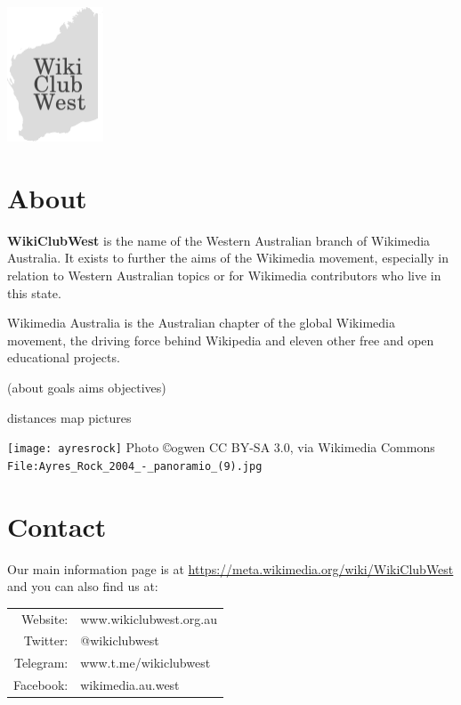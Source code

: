 \documentclass[a4paper,12pt]{article}
\begin{document}
\pagestyle{empty}

\begin{multicols}{3}

\begin{center}
\includegraphics[height=4cm]{logo.pdf}

\end{center}

\section{About}

\textbf{WikiClubWest} is the name of the Western Australian branch of Wikimedia Australia.
It exists to further the aims of the Wikimedia movement, especially in relation to Western Australian topics or for Wikimedia contributors who live in this state.

Wikimedia Australia is the Australian chapter of the global Wikimedia movement, the driving force behind Wikipedia and eleven other free and open educational projects.

(about goals aims objectives)

distances map
pictures

\texttt{[image: ayresrock]}
{\footnotesize Photo \copyright ogwen CC BY-SA 3.0, via Wikimedia Commons {\tt File:Ayres\_Rock\_2004\_-\_panoramio\_(9).jpg}}

\section{Contact}

Our main information page is at
\url{https://meta.wikimedia.org/wiki/WikiClubWest}
and you can also find us at:

\begin{tabular}{rl}
Website: & www.wikiclubwest.org.au \\
Twitter: & @wikiclubwest \\
Telegram: & www.t.me/wikiclubwest \\
Facebook: & wikimedia.au.west \\
\end{tabular}


\end{multicols}
\end{document}
